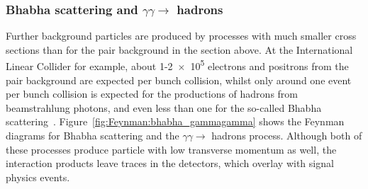 \subsubsection{Bhabha scattering and $\gamma\gamma\rightarrow$ hadrons}
\label{BeamBeam:bhabha_gammagamma}
Further background particles are produced by processes with much smaller cross sections than for the pair background in the section above.
At the International Linear Collider for example, about 1-\num{2e5} electrons and positrons from the pair background are expected per bunch collision, whilst only around one event per bunch collision is expected for the productions of hadrons from beamstrahlung photons, and even less than one for the so-called Bhabha scattering~\cite{SiDBkgNote}. 
Figure~\ref{fig:Feynman:bhabha_gammagamma} shows the Feynman diagrams for Bhabha scattering and the $\gamma\gamma\rightarrow$ hadrons process.
Although both of these processes produce particle with low transverse momentum as well, the interaction products leave traces in the detectors, which overlay with signal physics events.
